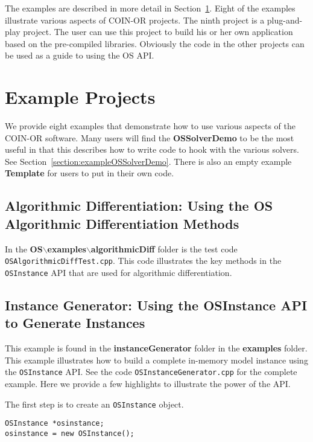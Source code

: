 \documentclass[11pt]{article}
\renewcommand{\{}{{\char"7B}}
\renewcommand{\}}{{\char"7D}}
\renewcommand{\^}{{\char"0D}}
\renewcommand{\'}{{\char"0D}}
\begin{document}
The examples are described in more detail in Section~\ref{section:examples}. Eight of the examples 
illustrate various aspects of COIN-OR projects.   The ninth project is  a plug-and-play project. 
The user can use this project to build his or her own application based on the pre-compiled libraries.
Obviously the code in the other projects can be used as a guide to using the OS API.

\section{Example Projects}\label{section:examples}

We provide eight examples that demonstrate how to use various aspects of the COIN-OR  software.  
Many users will find the {\bf OSSolverDemo} to be the most useful in that this describes 
how to write code to hook with the various solvers.  See Section~\ref{section:exampleOSSolverDemo}.  
There is also an empty example {\bf Template} for users to put in their own code. 

\subsection{Algorithmic Differentiation:  Using the OS Algorithmic Differentiation Methods}\label{section:cppad}

In the {\bf OS$\backslash$examples$\backslash$algorithmicDiff} folder is the test code 
{\tt OSAlgorithmicDiffTest.cpp}. This code illustrates the key methods in the 
{\tt OSInstance} API that are used for algorithmic differentiation.   


\subsection{Instance Generator: Using the OSInstance API to Generate Instances}\label{section:exampleOSInstanceGeneration}

This example is found in the {\bf instanceGenerator} folder in the {\bf examples} folder. This example illustrates
how to build a complete in-memory model instance using the {\tt OSInstance} API.
See the code {\tt OSInstanceGenerator.cpp} for the complete example. Here we provide a few highlights to illustrate
the power of the API.

The first step is to create an {\tt OSInstance} object.
\begin{verbatim}
OSInstance *osinstance;
osinstance = new OSInstance();
\end{verbatim}
\end{document}

